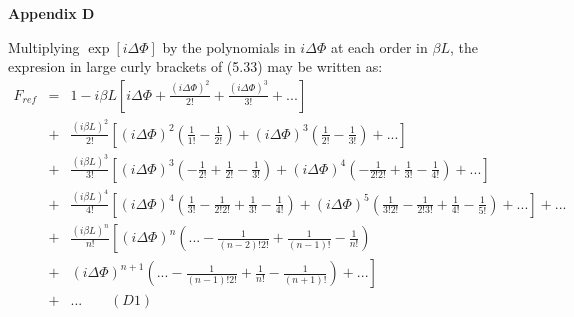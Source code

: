 { 
 \newpage
  {\bf Appendix D}
  \par Multiplying $\exp[i\Delta \Phi]$ by the polynomials in $i\Delta \Phi$
   at each order in $\beta L$, the expresion in large curly brackets of (5.33) may be
    written as:
   \begin{eqnarray}
 F_{ref} & = & 1-i\beta L \left[i\Delta \Phi +\frac{(i\Delta \Phi)^2}{2!}+\frac{(i\Delta \Phi)^3}{3!}
   +...\right] \nonumber \\
     & + & \frac{(i\beta L)^2}{2!}\left[(i\Delta \Phi)^2 \left( \frac{1}{1!}-\frac{1}{2!}\right)+
     (i\Delta \Phi)^3 \left(\frac{1}{2!}-\frac{1}{3!}\right)+...\right]  \nonumber \\
     & + & \frac{(i\beta L)^3}{3!}\left[(i\Delta \Phi)^3 \left(-\frac{1}{2!}+\frac{1}{2!}-\frac{1}{3!}\right)+
     (i\Delta \Phi)^4 \left(-\frac{1}{2!2!}+\frac{1}{3!} -\frac{1}{4!} \right)+...\right]  \nonumber \\     
   & + & \frac{(i\beta L)^4}{4!}\left[(i\Delta \Phi)^4 \left(\frac{1}{3!}-\frac{1}{2!2!}
    +\frac{1}{3!}-\frac{1}{4!}\right)+
     (i\Delta \Phi)^5\left(\frac{1}{3!2!}-\frac{1}{2!3!} +\frac{1}{4!}- \frac{1}{5!}  \right)+...\right] +... \nonumber \\
   & + & \frac{(i\beta L)^n}{n!}\left[(i\Delta \Phi)^n\left(...-\frac{1}{(n-2)!2!}+\frac{1}{(n-1)!} 
    -  \frac{1}{n!}\right) \right. \nonumber \\
   & + & \left. (i\Delta \Phi)^{n+1}\left(...-\frac{1}{(n-1)!2!}+\frac{1}{n!} -\frac{1}{(n+1)!} \right)+...\right]
  \nonumber \\
   & +  & ... ~~~~~~~~~(D1) \nonumber
 \end{eqnarray}

}
